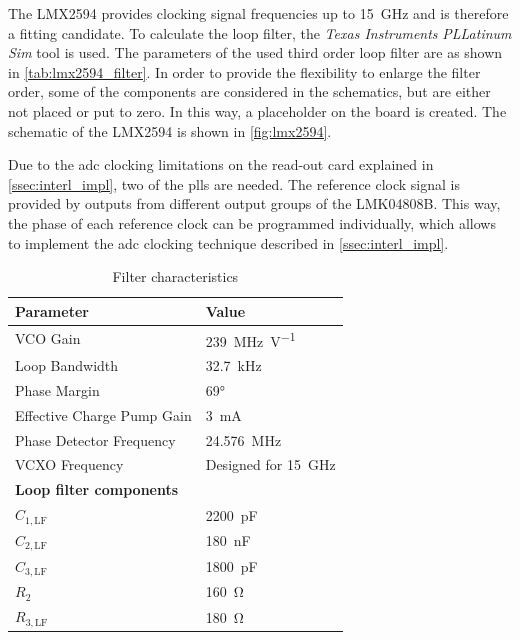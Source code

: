 The LMX2594 provides clocking signal frequencies up to \SI{15}{\giga \hertz} and is therefore a fitting candidate. 
To calculate the loop filter, the \textit{Texas Instruments} \textit{PLLatinum Sim} tool is used. The parameters of the used third order loop filter are as shown in \autoref{tab:lmx2594_filter}.
In order to provide the flexibility to enlarge the filter order, some of the components are considered in the schematics, but are either not placed or put to zero. 
In this way, a placeholder on the board is created.
The schematic of the LMX2594 is shown in \autoref{fig:lmx2594}.

Due to the \gls{adc} clocking limitations on the read-out card explained in \autoref{ssec:interl_impl}, two of the \glspl{pll} are needed. 
The reference clock signal is provided by outputs from different output groups of the LMK04808B. This way, the phase of each reference clock can be programmed individually, which allows to implement the \gls{adc} clocking technique described in \autoref{ssec:interl_impl}.


\begin{table}[tbh]
	\caption[LMX2594 Filter characteristics]{Filter characteristics}
	\label{tab:lmx2594_filter}
	\centering
	\begin{tabularx}{\textwidth}{Xl}
		\toprule
		\textbf{Parameter}                         & \textbf{Value}             \\ \bottomrule
		VCO Gain                                   & \SI{239}{\MHz\per\volt}    \\
		Loop Bandwidth                             & \SI{32.7}{\kHz}            \\
		Phase Margin                               & \ang{69}                   \\
		Effective Charge Pump Gain                 & \SI{3}{\milli\ampere}      \\
		Phase Detector Frequency                   & \SI{24.576}{\MHz}          \\
		VCXO Frequency                             & Designed for \SI{15}{\GHz} \\
		[0.3cm]
		 \textbf{Loop filter components} &                            \\
		$C_{1,\text{LF}}$                          & \SI{2200}{\pico\farad}     \\
		$C_{2,\text{LF}}$                          & \SI{180}{\nano\farad}      \\
		$C_{3,\text{LF}}$                          & \SI{1800}{\pico\farad}     \\
		$R_{2}$                                    & \SI{160}{\ohm}             \\
		$R_{3,\text{LF}}$                          & \SI{180}{\ohm}             \\ \bottomrule
	\end{tabularx}
\end{table}

